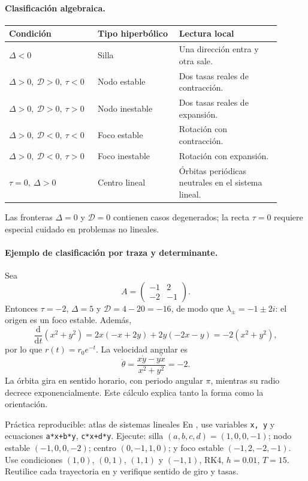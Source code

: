 \paragraph{Clasificación algebraica.}
\begin{longtable}{>{\raggedright\arraybackslash}p{0.27\linewidth}
                  >{\raggedright\arraybackslash}p{0.28\linewidth}
                  >{\raggedright\arraybackslash}p{0.35\linewidth}}
\toprule
Condición & Tipo hiperbólico & Lectura local \\
\midrule
\endhead
\(\Delta<0\) & Silla & Una dirección entra y otra sale.\\
\(\Delta>0,\ \mathcal D>0,\ \tau<0\) & Nodo estable & Dos tasas reales de
contracción.\\
\(\Delta>0,\ \mathcal D>0,\ \tau>0\) & Nodo inestable & Dos tasas reales de
expansión.\\
\(\Delta>0,\ \mathcal D<0,\ \tau<0\) & Foco estable & Rotación con contracción.\\
\(\Delta>0,\ \mathcal D<0,\ \tau>0\) & Foco inestable & Rotación con expansión.\\
\(\tau=0,\ \Delta>0\) & Centro lineal & Órbitas periódicas neutrales en el sistema
lineal.\\
\bottomrule
\end{longtable}
Las fronteras \(\Delta=0\) y \(\mathcal D=0\) contienen casos degenerados; la recta
\(\tau=0\) requiere especial cuidado en problemas no lineales.

\paragraph{Ejemplo de clasificación por traza y determinante.}
Sea
\[
 A=\begin{pmatrix}-1&2\\-2&-1\end{pmatrix}.
\]
Entonces \(\tau=-2\), \(\Delta=5\) y
\(\mathcal D=4-20=-16\), de modo que
\(\lambda_\pm=-1\pm2i\): el origen es un foco estable. Además,
\[
 \frac{\mathrm d}{\mathrm dt}(x^2+y^2)
 =2x(-x+2y)+2y(-2x-y)=-2(x^2+y^2),
\]
por lo que \(r(t)=r_0e^{-t}\). La velocidad angular es
\[
 \dot\theta=\frac{x\dot y-y\dot x}{x^2+y^2}=-2.
\]
La órbita gira en sentido horario, con periodo angular \(\pi\), mientras su radio
decrece exponencialmente. Este cálculo explica tanto la forma como la orientación.

\begin{activitybox}{Práctica reproducible: atlas de sistemas lineales}
En , use variables \texttt{x, y} y ecuaciones \texttt{a*x+b*y},
\texttt{c*x+d*y}. Ejecute: silla \((a,b,c,d)=(1,0,0,-1)\); nodo estable
\((-1,0,0,-2)\); centro \((0,-1,1,0)\); y foco estable
\((-1,2,-2,-1)\). Use condiciones \((1,0)\), \((0,1)\), \((1,1)\) y
\((-1,1)\), RK4, \(h=0.01\), \(T=15\). Reutilice cada trayectoria en
 y verifique sentido de giro y tasas.
\end{activitybox}

